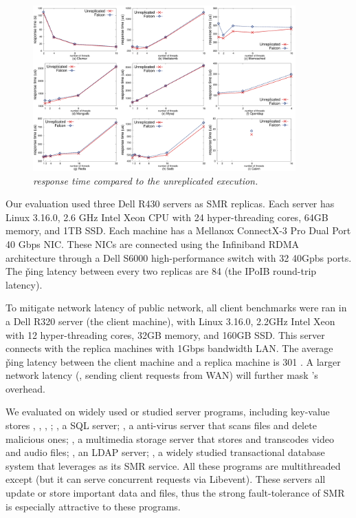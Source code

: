 \begin{figure}[t]
\centering
\includegraphics[width=0.9\textwidth]{figures/latency}
\vspace{-.10in}
\caption{\small {\em \xxx response time compared to the unreplicated 
execution.}}
\vspace{-.20in}
\label{fig:latency}
\end{figure}

Our evaluation used three Dell R430 servers as SMR replicas. Each server has 
Linux 3.16.0, 2.6 GHz Intel Xeon CPU with 24 hyper-threading cores, 64GB 
memory, and 1TB SSD. Each machine has a Mellanox ConnectX-3 Pro Dual Port 40 
Gbps NIC. These NICs are connected using the Infiniband RDMA architecture 
through a Dell S6000 high-performance switch with 32 40Gpbs ports. The \v{ping} 
latency between every two replicas are 84 \us (the IPoIB round-trip latency).

To mitigate network latency of public network, all client benchmarks were ran 
in a Dell R320 server (the client machine), with Linux 3.16.0, 2.2GHz Intel 
Xeon with 12 hyper-threading cores, 32GB memory, and 160GB SSD. This server 
connects with the replica machines with 1Gbps bandwidth LAN. The average 
\v{ping} latency between the client machine and a replica machine is 301 \us. A 
larger network latency (\eg, sending client requests from WAN) will further 
mask \xxx's overhead.

We evaluated \xxx on \nprog widely used or studied server programs, including 
\nkvprog key-value stores \redis, \memcached, \ssdb, \mongodb; \mysql, a SQL 
server; \clamav, a anti-virus server that scans files and delete malicious ones; 
\mediatomb, a multimedia storage server that stores and transcodes video and 
audio files; \openldap, an LDAP server; \calvin, a widely studied transactional 
database system that leverages \zookeeper as its SMR service. All these programs 
are multithreaded except \redis (but it can serve concurrent requests via 
Libevent). These servers all update or store important data and files, thus the 
strong fault-tolerance of SMR is especially attractive to these programs.

